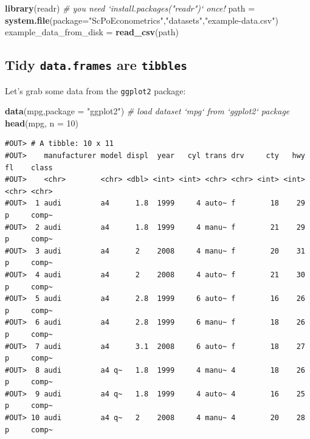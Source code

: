 \documentclass[]{book}
\newenvironment{Shaded}{\begin{snugshade}}{\end{snugshade}}
\newcommand{\CommentTok}[1]{\textcolor[rgb]{0.56,0.35,0.01}{\textit{#1}}}
\newcommand{\DataTypeTok}[1]{\textcolor[rgb]{0.13,0.29,0.53}{#1}}
\newcommand{\DecValTok}[1]{\textcolor[rgb]{0.00,0.00,0.81}{#1}}
\newcommand{\KeywordTok}[1]{\textcolor[rgb]{0.13,0.29,0.53}{\textbf{#1}}}
\newcommand{\NormalTok}[1]{#1}
\newcommand{\StringTok}[1]{\textcolor[rgb]{0.31,0.60,0.02}{#1}}
\begin{document}
\begin{Shaded}
\begin{Highlighting}[]
\KeywordTok{library}\NormalTok{(readr)  }\CommentTok{# you need `install.packages("readr")` once!}
\NormalTok{path =}\StringTok{ }\KeywordTok{system.file}\NormalTok{(}\DataTypeTok{package=}\StringTok{"ScPoEconometrics"}\NormalTok{,}\StringTok{"datasets"}\NormalTok{,}\StringTok{"example-data.csv"}\NormalTok{)}
\NormalTok{example_data_from_disk =}\StringTok{ }\KeywordTok{read_csv}\NormalTok{(path)}
\end{Highlighting}
\end{Shaded}

\hypertarget{tidy-data.frames-are-tibbles}{%
\subsection{\texorpdfstring{Tidy \texttt{data.frames} are \texttt{tibbles}}{Tidy data.frames are tibbles}}\label{tidy-data.frames-are-tibbles}}

Let's grab some data from the \texttt{ggplot2} package:

\begin{Shaded}
\begin{Highlighting}[]
\KeywordTok{data}\NormalTok{(mpg,}\DataTypeTok{package =} \StringTok{"ggplot2"}\NormalTok{)  }\CommentTok{# load dataset `mpg` from `ggplot2` package}
\KeywordTok{head}\NormalTok{(mpg, }\DataTypeTok{n =} \DecValTok{10}\NormalTok{)}
\end{Highlighting}
\end{Shaded}

\begin{verbatim}
#OUT> # A tibble: 10 x 11
#OUT>    manufacturer model displ  year   cyl trans drv     cty   hwy fl    class
#OUT>    <chr>        <chr> <dbl> <int> <int> <chr> <chr> <int> <int> <chr> <chr>
#OUT>  1 audi         a4      1.8  1999     4 auto~ f        18    29 p     comp~
#OUT>  2 audi         a4      1.8  1999     4 manu~ f        21    29 p     comp~
#OUT>  3 audi         a4      2    2008     4 manu~ f        20    31 p     comp~
#OUT>  4 audi         a4      2    2008     4 auto~ f        21    30 p     comp~
#OUT>  5 audi         a4      2.8  1999     6 auto~ f        16    26 p     comp~
#OUT>  6 audi         a4      2.8  1999     6 manu~ f        18    26 p     comp~
#OUT>  7 audi         a4      3.1  2008     6 auto~ f        18    27 p     comp~
#OUT>  8 audi         a4 q~   1.8  1999     4 manu~ 4        18    26 p     comp~
#OUT>  9 audi         a4 q~   1.8  1999     4 auto~ 4        16    25 p     comp~
#OUT> 10 audi         a4 q~   2    2008     4 manu~ 4        20    28 p     comp~
\end{verbatim}
\end{document}
